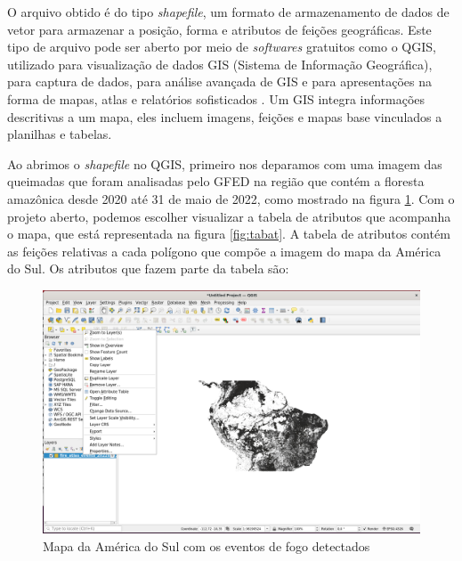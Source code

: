 O arquivo obtido é do tipo \textit{shapefile}, um formato de armazenamento de dados de vetor para armazenar a posição, forma e atributos de feições geográficas. Este tipo de arquivo pode ser aberto por meio de \textit{softwares} gratuitos como o QGIS, utilizado para visualização de dados GIS (Sistema de Informação Geográfica), para captura de dados, para análise avançada de GIS e para apresentações na forma de mapas, atlas e relatórios sofisticados \cite{qgis}. Um GIS integra informações descritivas a um mapa, eles incluem imagens, feições e mapas base vinculados a planilhas e tabelas.

Ao abrimos o \textit{shapefile} no QGIS, primeiro nos deparamos com uma imagem das queimadas que foram analisadas pelo GFED na região que contém a floresta amazônica desde 2020 até 31 de maio de 2022, como mostrado na figura \ref{fig:mapashp}. Com o projeto aberto, podemos escolher visualizar a tabela de atributos que acompanha o mapa, que está representada na figura \ref{fig:tabat}. A tabela de atributos contém as feições relativas a cada polígono que compõe a imagem do mapa da América do Sul. Os atributos que fazem parte da tabela são:

\begin{figure}[htb]
	\centering
	\begin{minipage}{0.9\linewidth}
		\centering
		\includegraphics[width=\linewidth]{tg1/figuras/mapa.png}
		\caption{Mapa da América do Sul com os eventos de fogo detectados} \label{fig:mapashp}
	\end{minipage}
\end{figure}


